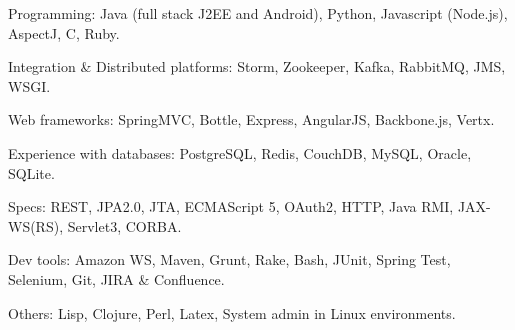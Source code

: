 \begin{rlist}
  \item Programming: Java (full stack J2EE and Android), Python, Javascript (Node.js),
  AspectJ, C, Ruby.
  \item Integration \& Distributed platforms: Storm, Zookeeper, Kafka, RabbitMQ, JMS, WSGI.
  \item Web frameworks: SpringMVC, Bottle, Express, AngularJS, Backbone.js, Vertx.
  \item Experience with databases: PostgreSQL, Redis, CouchDB, MySQL, Oracle, SQLite.
  \item Specs: REST, JPA2.0, JTA, ECMAScript 5, OAuth2, HTTP,
  Java RMI, JAX-WS(RS), Servlet3, CORBA.
  \item Dev tools: Amazon WS, Maven, Grunt, Rake, Bash, JUnit, Spring Test,
  Selenium, Git, JIRA \& Confluence.
  \item Others: Lisp, Clojure, Perl, Latex, System admin in Linux
  environments.
\end{rlist}

